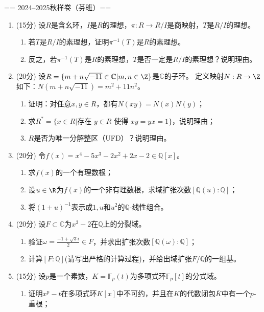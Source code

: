 == 2024--2025秋样卷（芬班）==

\begin{enumerate}
    \item (15分) 设$R$是含幺环，$I$是$R$的理想，$\pi:R \to R/I$是商映射，$T$是$R/I$的理想。
    \begin{enumerate}[label=(\alph*)]
        \item 若$T$是$R/I$的素理想，证明$\pi^{-1}(T)$是$R$的素理想。
        \item 反之，若$\pi^{-1}(T)$是$R$的素理想，$T$是否一定是$R/I$的素理想？说明理由。
    \end{enumerate}
    \item (20分) 设$R=\{m+n\sqrt{-11}\in\mathbb{C}|m,n\in\Z\}$是$\mathbb{C}$的子环。
    定义映射$N:R\to\Z$如下：$N(m+n\sqrt{-11})=m^2+11n^2$。
    \begin{enumerate}[label=(\alph*)]
        \item 证明：对任意$x,y \in R$，都有$N(xy)=N(x)N(y)$；
        \item 求$R^*=\{x \in R|\text{存在 }y \in R\text{ 使得 }xy=yx=1\}$，说明理由；
        \item $R$是否为唯一分解整区（UFD）？说明理由。
    \end{enumerate}
    \item (20分) 令$f(x)=x^4-5x^3-2x^2+2x-2\in\mathbb{Q}[x]$。
    \begin{enumerate}[label=(\arabic*)]
        \item 求$f(x)$的一个有理数根；
        \item 设$u\in\R$为$f(x)$的一个非有理数根，求域扩张次数$[\mathbb{Q}(u):\mathbb{Q}]$；
        \item 将$(1+u)^{-1}$表示成$1,u$和$u^2$的$\mathbb{Q}$-线性组合。
    \end{enumerate}
    \item (20分) 设$F\subset\mathbb{C}$为$x^3-2$在$\mathbb{Q}$上的分裂域。
    \begin{enumerate}[label=(\arabic*)]
        \item 验证$\omega=\frac{-1+\sqrt{3}i}{2} \in F$，并求出扩张次数$[\mathbb{Q}(\omega):\mathbb{Q}]$；
        \item 计算$[F:\mathbb{Q}]$(请写出严格的计算过程)，并给出域扩张$F/\mathbb{Q}$的一组基。
    \end{enumerate}
    \item (15分) 设$p$是一个素数，$K=\mathbb{F}_p(t)$为多项式环$\mathbb{F}_p[t]$的分式域。
    \begin{enumerate}[label=(\arabic*)]
        \item 证明$x^p-t$在多项式环$K[x]$中不可约，并且在$K$的代数闭包$\bar{K}$中有一个$p$-重根；

\end{enumerate}
\end{enumerate}
